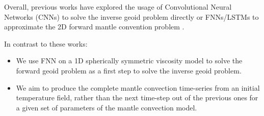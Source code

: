Overall, previous works have explored the usage of Convolutional Neural Networks (CNNs) to solve the inverse geoid problem directly \citep{kerl2022geoid} or FNNs/LSTMs to approximate the 2D forward mantle convention problem \citep{10.1103_physrevfluids.6.113801}. 

In contrast to these works:
\begin{itemize}
    \item We use FNN on a 1D spherically symmetric viscosity model to solve the forward geoid problem as a first step to solve the inverse geoid problem.
    
    \item We aim to produce the complete mantle convection time-series from an initial temperature field, rather than the next time-step out of the previous ones for a given set of parameters of the mantle convection model.
\end{itemize}
